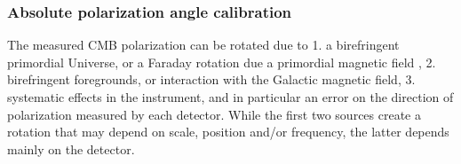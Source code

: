 \documentclass[PICOReport.tex]{subfiles}
\begin{document}
%

\subsubsection{Absolute polarization angle calibration}
\label{sec:angle}

The measured CMB polarization can be rotated due to 1. a birefringent primordial Universe, or a Faraday rotation
due a primordial magnetic field \citep{Pogosian+2018}, 2. birefringent
foregrounds, or interaction with the Galactic magnetic field,
3. systematic effects in the instrument, and in particular an error on
the direction of polarization measured by each detector.  
While the first two sources create a rotation that may depend on scale,
position and/or frequency, the latter depends mainly on
the detector. 
\end{document}
